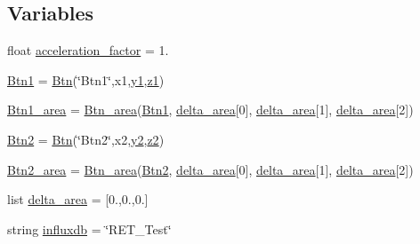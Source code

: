 \subsection*{Variables}
\begin{DoxyCompactItemize}
\item 
float \hyperlink{namespaceRET__config_a425bc201cf7b10f0c4f1068f752e7c9b}{acceleration\+\_\+factor} = 1.
\item 
\hyperlink{namespaceRET__config_af037c6b9ff0314103d8127acc9d07e0b}{Btn1} = \hyperlink{classRET__config_1_1Btn}{Btn}(\char`\"{}Btn1\char`\"{},x1,\hyperlink{namespaceRET__config_a9fe80bf4738047a31d7c162807ed85f0}{y1},\hyperlink{namespaceRET__config_a7da4886c0a2e03b8bb9ed62eb20efb78}{z1})
\item 
\hyperlink{namespaceRET__config_a118140d2896d1aff1e3c9355f9deb314}{Btn1\+\_\+area} = \hyperlink{classRET__config_1_1Btn__area}{Btn\+\_\+area}(\hyperlink{namespaceRET__config_af037c6b9ff0314103d8127acc9d07e0b}{Btn1}, \hyperlink{namespaceRET__config_abbf3fd8fafae6a457e57109bfaf9a6c5}{delta\+\_\+area}\mbox{[}0\mbox{]}, \hyperlink{namespaceRET__config_abbf3fd8fafae6a457e57109bfaf9a6c5}{delta\+\_\+area}\mbox{[}1\mbox{]}, \hyperlink{namespaceRET__config_abbf3fd8fafae6a457e57109bfaf9a6c5}{delta\+\_\+area}\mbox{[}2\mbox{]})
\item 
\hyperlink{namespaceRET__config_a73afa8c52cebd94e1889df5fbe3bec66}{Btn2} = \hyperlink{classRET__config_1_1Btn}{Btn}(\char`\"{}Btn2\char`\"{},x2,\hyperlink{namespaceRET__config_a07bcd014e69eddcf4243b2a961014eaf}{y2},\hyperlink{namespaceRET__config_a55196b87940893e540ba636218f4eb07}{z2})
\item 
\hyperlink{namespaceRET__config_a51a4083768cbc17b22a98ad63a7bf851}{Btn2\+\_\+area} = \hyperlink{classRET__config_1_1Btn__area}{Btn\+\_\+area}(\hyperlink{namespaceRET__config_a73afa8c52cebd94e1889df5fbe3bec66}{Btn2}, \hyperlink{namespaceRET__config_abbf3fd8fafae6a457e57109bfaf9a6c5}{delta\+\_\+area}\mbox{[}0\mbox{]}, \hyperlink{namespaceRET__config_abbf3fd8fafae6a457e57109bfaf9a6c5}{delta\+\_\+area}\mbox{[}1\mbox{]}, \hyperlink{namespaceRET__config_abbf3fd8fafae6a457e57109bfaf9a6c5}{delta\+\_\+area}\mbox{[}2\mbox{]})
\item 
list \hyperlink{namespaceRET__config_abbf3fd8fafae6a457e57109bfaf9a6c5}{delta\+\_\+area} = \mbox{[}0.,0.,0.\mbox{]}
\item 
string \hyperlink{namespaceRET__config_a6297da7d9cbabcbe91effb0271677ff3}{influxdb} = \char`\"{}R\+E\+T\+\_\+\+Test\char`\"{}
\item 

\end{DoxyCompactItemize}
